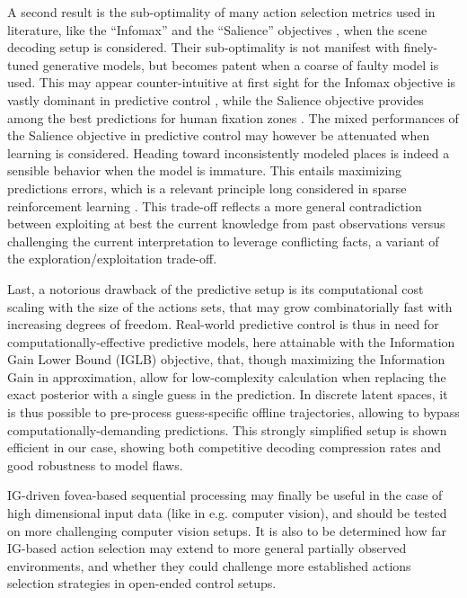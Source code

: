 \documentclass[12pt,twoside,openright]{article}
\begin{document}
A second result is the sub-optimality of many action selection metrics used in literature, like the ``Infomax'' \citep{butko2010infomax} and the ``Salience'' objectives \citep{itti2005bayesian}, when the scene decoding setup is considered. Their sub-optimality is not manifest with finely-tuned generative models, but becomes patent when a coarse of faulty model is used.
This may appear counter-intuitive at first sight for the Infomax objective is vastly dominant in predictive control \citep{najemnik2009simple}, while the Salience objective provides among the best predictions for human fixation zones \citep{itti2005bayesian}. The mixed performances of the Salience objective in predictive control may however be attenuated when learning is considered. Heading toward inconsistently modeled places is indeed a sensible behavior when the model is immature. This entails maximizing predictions errors, which is a relevant principle long considered in sparse reinforcement learning \citep{schmidhuber1991curious,oudeyer2008can,pathak2017curiosity}. 
This trade-off reflects a more general contradiction between exploiting at best the current knowledge from past observations versus challenging the current interpretation to leverage conflicting facts, a variant of the exploration/exploitation trade-off. 

Last, a notorious drawback of the predictive setup is its computational cost scaling with the size of the actions sets, that may grow combinatorially fast with increasing degrees of freedom. Real-world predictive control is thus in need for computationally-effective predictive models, here attainable with the Information Gain Lower Bound (IGLB) objective, that, though maximizing the Information Gain in approximation, allow for low-complexity calculation when replacing the exact posterior with a single guess in the prediction. In discrete latent spaces, it is thus possible to pre-process guess-specific offline trajectories, allowing to bypass computationally-demanding predictions. This strongly simplified setup is shown efficient in our case, showing both competitive decoding compression rates and good robustness to model flaws. 

IG-driven fovea-based sequential processing may finally be useful in the case of high dimensional input data (like in e.g. computer vision), and should be tested on more challenging computer vision setups. 
	It is also to be determined how far IG-based action selection  may extend to more general partially observed environments, and whether they could challenge more established actions selection strategies in open-ended control setups.
\end{document}
